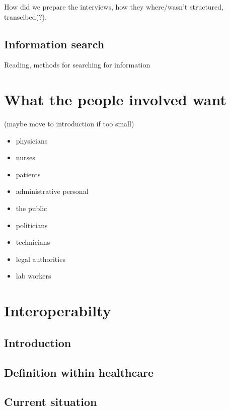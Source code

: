 \documentclass[12pt]{article}
\begin{document}
How did we prepare the interviews, how they where/wasn't structured, transcibed(?).

\subsection{Information search}
Reading, methods for searching for information

\newpage

\section{What the people involved want}
(maybe move to introduction if too small)
\begin{itemize}
\item physicians
\item nurses
\item patients
\item administrative personal
\item the public
\item politicians
\item technicians
\item legal authorities
\item lab workers
\end{itemize}

\newpage

\section{Interoperabilty}

\subsection{Introduction} %

\subsection{Definition within healthcare} %
\label{sec:interoperabilityDefinition}

\subsection{Current situation} %
\end{document}
